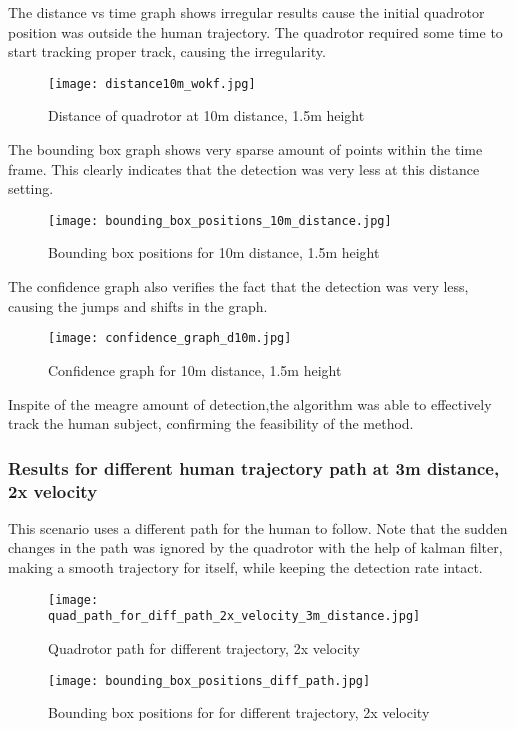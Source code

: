 The distance vs time graph shows irregular results cause the initial quadrotor position was outside the human trajectory. The quadrotor required some time to start tracking proper track, causing the irregularity.
\begin{figure}[!htb]
	\centering
	\texttt{[image: distance10m\_wokf.jpg]}
	\caption{Distance of quadrotor at 10m distance, 1.5m height\label{Distance of quadrotor at 10m distance, 1.5m height}}
\end{figure}

The bounding box graph shows very sparse amount of points within the time frame. This clearly indicates that the detection was very less at this distance setting.
\begin{figure}[!htb]
	\centering
	\texttt{[image: bounding\_box\_positions\_10m\_distance.jpg]}
	\caption{Bounding box positions for 10m distance, 1.5m height\label{Bounding box positions for 10m distance, 1.5m height}}
\end{figure}

The confidence graph also verifies the fact that the detection was very less, causing the jumps and shifts in the graph.
\begin{figure}[!htb]
	\centering
	\texttt{[image: confidence\_graph\_d10m.jpg]}
	\caption{Confidence graph for 10m distance, 1.5m height\label{Confidence graph for 10m distance, 1.5m height}}
\end{figure}
Inspite of the meagre amount of detection,the algorithm was able to effectively track the human subject, confirming the feasibility of the method.

\newpage
\subsubsection{Results for different human trajectory path at 3m distance, 2x velocity}
This scenario uses a different path for the human to follow. Note that the sudden changes in the path was ignored by the quadrotor with the help of kalman filter, making a smooth trajectory for itself, while keeping the detection rate intact.

\begin{figure}[!htb]
	\centering
	\texttt{[image: quad\_path\_for\_diff\_path\_2x\_velocity\_3m\_distance.jpg]}
	\caption{Quadrotor path for different trajectory, 2x velocity\label{Quadrotor path for different trajectory, 2x velocity}}
\end{figure}

\begin{figure}[!htb]
	\centering
	\texttt{[image: bounding\_box\_positions\_diff\_path.jpg]}
	\caption{Bounding box positions for for different trajectory, 2x velocity\label{Bounding box positions for for different trajectory, 2x velocity}}
\end{figure}





